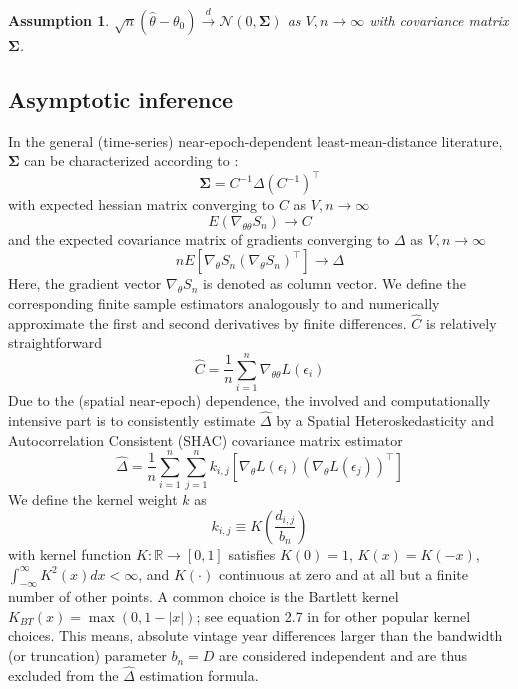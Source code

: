 \documentclass[12pt]{article}
\newtheorem{assume}{Assumption}
\begin{document}
\begin{assume}
	$\sqrt{n}(\hat{\theta} - \theta_0) \overset{d}{\to} \mathcal{N}(0,\mathbf{\Sigma})$ as $V,n \to \infty$ with covariance matrix $\mathbf{\Sigma}$.
\end{assume}

\subsection{Asymptotic inference}
\label{sec:asymptotic_inference}

In the general (time-series) near-epoch-dependent least-mean-distance literature, $\mathbf{\Sigma}$ can be characterized according to \citet[Theorem 11.2.b, Theorem H.1]{PP97}:
\[
\mathbf{\Sigma} = C^{-1} \Delta (C^{-1})^\top
\]
with expected hessian matrix converging to $C$ as $V,n \to \infty$
\[
E 
\left(
\nabla_{\theta \theta} S_n
\right)
\to C
\]
and the expected covariance matrix of gradients converging to $\Delta$ as $V,n \to \infty$
\[
n E 
\left[
\nabla_{\theta} S_n
(\nabla_{\theta} S_n)^\top
\right]
\to \Delta
\]
Here, the gradient vector $\nabla_{\theta} S_n$ is denoted as column vector.
We define the corresponding finite sample estimators analogously to \citet[Chapters 12, 13.1]{PP97} and numerically approximate the first and second derivatives by finite differences. $\hat{C}$ is relatively straightforward
\[
\hat{C} = \frac{1}{n} \sum_{i=1}^n \nabla_{\theta \theta} L \left( \epsilon_i \right)
\]
Due to the (spatial near-epoch) dependence, the involved and computationally intensive part is to consistently estimate $\hat{\Delta}$ by a Spatial Heteroskedasticity and Autocorrelation Consistent (SHAC) covariance matrix estimator \cite[equation 2]{KS11}
\begin{equation}
\label{eq:hac}
\hat{\Delta} = \frac{1}{n} \sum_{i=1}^n \sum_{j=1}^n
k_{i,j}
\left[
\nabla_{\theta} L \left( \epsilon_i \right)
\left(
\nabla_{\theta} L \left( \epsilon_j \right)
\right)^\top
\right]
\end{equation}
We define the kernel weight $k$ as
\[
k_{i,j} \equiv K \left( \frac{d_{i,j}}{b_n} \right)
\]
with kernel function $K: \mathbb{R} \to [0,1]$ satisfies $K(0)=1$, $K(x)=K(-x)$, $\int_{-\infty}^{\infty} K^2(x) dx < \infty$, and $K(\cdot)$ continuous at zero and at all but a finite number of other points.
A common choice is the Bartlett kernel $K_{BT}(x)= \max(0, 1-|x|)$; see equation 2.7 in \cite{A91} for other popular kernel choices.
This means, absolute vintage year differences larger than the bandwidth (or truncation) parameter $b_n=D$ are considered independent and are thus excluded from the $\hat{\Delta}$ estimation formula.
\end{document}

